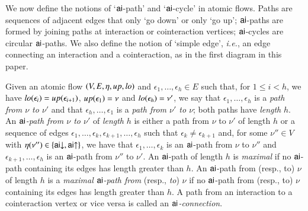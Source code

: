 We now define the notions of `$\mathsf{ai}$-path' and `$\mathsf{ai}$-cycle' in atomic flows. Paths are sequences of adjacent edges that only `go down' or only `go up'; $\mathsf{ai}$-paths are formed by joining paths at interaction or cointeraction vertices; $\mathsf{ai}$-cycles are circular $\mathsf{ai}$-paths. We also define the notion of `simple edge', \emph{i.e.}, an edge connecting an interaction and a cointeraction, as in the first diagram in this paper.

\begin{definition}\label{definition:FlowPaths}
Given an atomic flow $(V,E,\eta,{\mathit up},{\mathit lo})$ and $\epsilon_1,\dots,\epsilon_h\in E$ such that, for $1\le i<h$, we have ${\mathit lo}(\epsilon_i)={\mathit up}(\epsilon_{i+1})$, ${\mathit up}(\epsilon_1)=\nu$ and ${\mathit lo}(\epsilon_h)=\nu'$, we say that $\epsilon_1,\dots,\epsilon_h$ is a \emph{path from $\nu$ to $\nu'$} and that $\epsilon_h,\dots,\epsilon_1$ is a \emph{path from $\nu'$ to $\nu$}; both paths have \emph{length} $h$. An \emph{$\mathsf{ai}$-path from $\nu$ to $\nu'$} of \emph{length} $h$ is either a path from $\nu$ to $\nu'$ of length $h$ or a sequence of edges $\epsilon_1,\dots,\epsilon_k,\epsilon_{k+1},\dots,\epsilon_h$ such that $\epsilon_k \ne \epsilon_{k+1}$ and, for some $\nu''\in V$ with $\eta(\nu'')\in\{\mathsf{ai}{\downarrow},\mathsf{ai}{\uparrow}\}$, we have that $\epsilon_1,\dots,\epsilon_k$ is an $\mathsf{ai}$-path from $\nu$ to $\nu''$ and $\epsilon_{k+1},\dots,\epsilon_h$ is an $\mathsf{ai}$-path from $\nu''$ to $\nu'$. An $\mathsf{ai}$-path of length $h$ is \emph{maximal} if no $\mathsf{ai}$-path containing its edges has length greater than $h$. An $\mathsf{ai}$-path from (resp., to) $\nu$ of length $h$ is a \emph{maximal\/ $\mathsf{ai}$-path from} (resp., \emph{to}) $\nu$ if no $\mathsf{ai}$-path from (resp., to) $\nu$ containing its edges has length greater than $h$. A path from an interaction to a cointeraction vertex or vice versa is called an \emph{$\mathsf{ai}$-connection}.
\end{definition}

